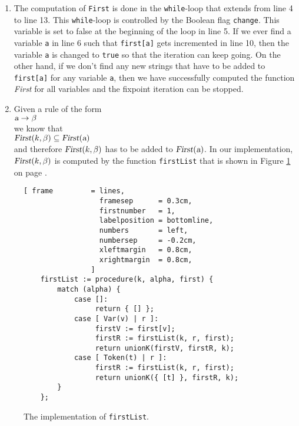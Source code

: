 \begin{enumerate}
      Since the function \texttt{first} is computed via a fixpoint iteration, $\mathtt{first}[\textsl{a}]$
      is initialized to the empty set for all syntactical variables $\textsl{a}$.  This is done by the function
      \texttt{initializeMap} in line 2.  The function \texttt{initializeMap} is shown in
      Figure \ref{fig:llk.stlx:auxiliary} in line 1.
\item The computation of \texttt{First} is done in the \texttt{while}-loop that extends from line 4
      to line 13.  This \texttt{while}-loop is controlled by the Boolean flag
      \texttt{change}.  This variable is set to false at the beginning of the loop in line 5.
      If we ever find a variable \texttt{a} in line 6 such that \texttt{first[a]} gets incremented
      in line 10,
      then the variable \texttt{a} is changed to \texttt{true} so that the iteration can keep going.
      On the other hand, if we don't find any new strings that have to be added to \texttt{first[a]}
      for any variable \texttt{a}, then we have successfully computed the function \textsl{First}
      for all variables and the fixpoint iteration can be stopped.
\item Given a rule of the form
      \\[0.2cm]
      \hspace*{1.3cm}
      $\textsl{a} \rightarrow \beta$
      \\[0.2cm]
      we know that 
      \\[0.2cm]
      \hspace*{1.3cm}
      $\textsl{First}(k, \beta) \subseteq \textsl{First}(\textsl{a})$
      \\[0.2cm]
      and therefore $\textsl{First}(k, \beta)$ has to be added to $\textsl{First}(\textsl{a})$.
      In our implementation,  $\textsl{First}(k, \beta)$ is computed by the function
      \texttt{firstList} that is shown in Figure \ref{fig:llk.stlx:firstList} on page
      \pageref{fig:llk.stlx:firstList}.
\end{enumerate}


\begin{figure}[!ht]
\centering
\begin{Verbatim}[ frame         = lines, 
                  framesep      = 0.3cm, 
                  firstnumber   = 1,
                  labelposition = bottomline,
                  numbers       = left,
                  numbersep     = -0.2cm,
                  xleftmargin   = 0.8cm,
                  xrightmargin  = 0.8cm,
                ]
    firstList := procedure(k, alpha, first) {
        match (alpha) {
            case []: 
                 return { [] };
            case [ Var(v) | r ]:
                 firstV := first[v];
                 firstR := firstList(k, r, first);
                 return unionK(firstV, firstR, k);
            case [ Token(t) | r ]:
                 firstR := firstList(k, r, first);
                 return unionK({ [t] }, firstR, k);
        }
    }; 
\end{Verbatim}
\vspace*{-0.3cm}
\caption{The implementation of \texttt{firstList}.}
\label{fig:llk.stlx:firstList}
\end{figure}

